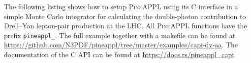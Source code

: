 
The following listing shows how to setup \textsc{PineAPPL} using its C interface in a simple Monte Carlo integrator for calculating the double-photon contribution to Drell--Yan lepton-pair production at the LHC.
All \textsc{PineAPPL} functions have the prefix \texttt{pineappl\_}.
The full example together with a makefile can be found at \url{https://github.com/N3PDF/pineappl/tree/master/examples/capi-dy-aa}.
The documentation of the C API can be found at \url{https://docs.rs/pineappl_capi}.

